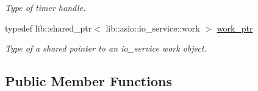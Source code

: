 \begin{DoxyCompactItemize}
\begin{DoxyCompactList}\small\item\em Type of timer handle. \end{DoxyCompactList}\item 
typedef lib\+::shared\+\_\+ptr$<$ lib\+::asio\+::io\+\_\+service\+::work $>$ \hyperlink{classwebsocketpp_1_1transport_1_1asio_1_1endpoint_ac730e8330bb982f9144127e9d66d0a23}{work\+\_\+ptr}
\begin{DoxyCompactList}\small\item\em Type of a shared pointer to an io\+\_\+service work object. \end{DoxyCompactList}\end{DoxyCompactItemize}
\subsection*{Public Member Functions}
